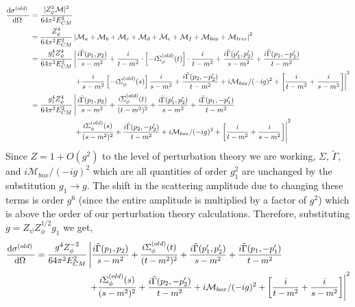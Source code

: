 \documentclass{article}
\begin{document}
\begin{align*}
\frac{\mathrm{d}\sigma^{(old)} \:}{\mathrm{d}\Omega \:} & = \frac{|Z^2_{\psi} \mathcal{M}|^2}{64 \pi^2 E_{CM}^2}
\\
& = \frac{Z^4_{\psi}}{64 \pi^2 E_{CM}^2} \left| \mathcal{M}_a + \mathcal{M}_b + \mathcal{M}_c + \mathcal{M}_d + \mathcal{M}_e + \mathcal{M}_f + \mathcal{M}_{box} + \mathcal{M}_{tree} \right|^2 
\\
& = \frac{g_1^4 Z^4_{\psi}}{64 \pi^2 E_{CM}^2} \left|  \frac{i\tilde{\Gamma}(p_1, p_2)}{s  - m^2} + \frac{i}{t - m^2} \cdot\left[ -i \Sigma_\phi^{(old)}(t) \right] \cdot \frac{i}{t - m^2} + \frac{i \tilde{\Gamma}(p_1', p_2')}{s - m^2} 
+  \frac{i\tilde{\Gamma}(p_1, -p_1')}{t - m^2} \right.
\\ 
& \left.
\quad \quad \quad \quad \quad \quad 
+ \frac{i}{s - m^2} \left[- i \Sigma_\phi^{(old)}(s) \right] \frac{i}{s - m^2} + \frac{i \tilde{\Gamma}(p_2, -p_2')}{t - m^2} + i\mathcal{M}_{box}/(-ig)^2 +  \left[\frac{i}{t - m^2 } + \frac{i}{s - m^2 }\right] \right|^2 
\\
& = \frac{g_1^4 Z^4_{\psi}}{64 \pi^2 E_{CM}^2} \left|  \frac{ i\tilde{\Gamma}(p_1, p_2)}{s  - m^2} + \frac{i \Sigma_\phi^{(old)}(t)}{(t - m^2)^2} + \frac{i\tilde{\Gamma}(p_1', p_2')}{s - m^2} 
+  \frac{i\tilde{\Gamma}(p_1, -p_1')}{t - m^2} \right.
\\ 
& \left.
\quad \quad \quad \quad \quad \quad 
+ \frac{i \Sigma_\phi^{(old)}(s)}{(s - m^2)^2} + \frac{i\tilde{\Gamma}(p_2, -p_2')}{t - m^2} + i\mathcal{M}_{box}/(-ig)^2 + \left[\frac{i}{t - m^2 } + \frac{i}{s - m^2 }\right] \right|^2 
\end{align*} 
Since $Z = 1 + O(g^2)$ to the level of perturbation theory we are working, $\Sigma$, $\tilde{\Gamma}$, and $i\mathcal{M}_{box}/(-ig)^2$ which are all quantities of order $g_1^2$ are unchanged by the substitution $g_1 \to g$. The shift in the scattering amplitude due to changing these terms is order $g^6$ (since the entire amplitude is multiplied by a factor of $g^2$) which is above the order of our perturbation theory calculations. Therefore, substituting $g = Z_\psi Z_\phi^{1/2} g_1$ we get,
\begin{align*}
\frac{\mathrm{d}\sigma^{(old)} \:}{\mathrm{d}\Omega \:} &= \frac{g^4 Z_\phi^{-2}}{64 \pi^2 E_{CM}^2} \left|  \frac{i \tilde{\Gamma}(p_1, p_2)}{s  - m^2} + \frac{i \Sigma_\phi^{(old)}(t)}{(t - m^2)^2} + \frac{i\tilde{\Gamma}(p_1', p_2')}{s - m^2} 
+  \frac{i\tilde{\Gamma}(p_1, -p_1')}{t - m^2} \right.
\\ 
& \left.
\quad \quad \quad \quad \quad \quad 
+ \frac{i \Sigma_\phi^{(old)}(s)}{(s - m^2)^2} + \frac{i\tilde{\Gamma}(p_2, -p_2')}{t - m^2} + i\mathcal{M}_{box}/(-ig)^2 + \left[\frac{i}{t - m^2 } + \frac{i}{s - m^2 }\right] \right|^2 
\end{align*}  
\end{document}
